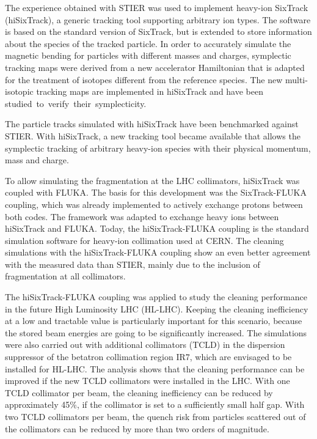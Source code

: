 The experience obtained with STIER was used to implement heavy-ion SixTrack (hiSixTrack), a generic tracking tool supporting arbitrary ion types. The software is based on the standard version of SixTrack, but is extended to store information about the species of the tracked particle. In order to accurately simulate the magnetic bending for particles with different masses and charges, symplectic tracking maps were derived from a new accelerator Hamiltonian that is adapted for the treatment of isotopes different from the reference species. The new multi-isotopic tracking maps are implemented in hiSixTrack and have been \mbox{studied to verify their symplecticity}. 
\vspace{0.2cm}

The particle tracks simulated with hiSixTrack have been benchmarked against STIER. With hiSixTrack, a new tracking tool became available that allows the symplectic tracking of arbitrary heavy-ion species with their physical momentum, mass and charge. 
\vspace{0.2cm}

To allow simulating the fragmentation at the LHC collimators, hiSixTrack was coupled with FLUKA. The basis for this development was the SixTrack-FLUKA coupling, which was already implemented to actively exchange protons between both codes. The framework was adapted to exchange heavy ions between hiSixTrack and FLUKA. Today, the hiSixTrack-FLUKA coupling is the standard simulation software for heavy-ion collimation used at CERN. The cleaning simulations with the hiSixTrack-FLUKA coupling show an even better agreement with the measured data than STIER, mainly due to the inclusion of fragmentation at all collimators. 
\vspace{0.2cm} 

The hiSixTrack-FLUKA coupling was applied to study the cleaning performance in the future High Luminosity LHC (HL-LHC). Keeping the cleaning inefficiency at a low and tractable value is particularly important for this scenario, because the stored beam energies are going to be significantly increased. The simulations were also carried out with additional collimators (TCLD) in the dispersion suppressor of the betatron collimation region IR7, which are envisaged to be installed for HL-LHC.  The analysis shows that the cleaning performance can be improved if the new TCLD collimators were installed in the LHC. With one TCLD collimator per beam, the cleaning inefficiency can be reduced by approximately 45\%, if the collimator is set to a sufficiently small half gap. With two TCLD collimators per beam, the quench risk from particles scattered out of the collimators can be reduced by more than two orders of magnitude. 
\vspace{0.2cm} 

